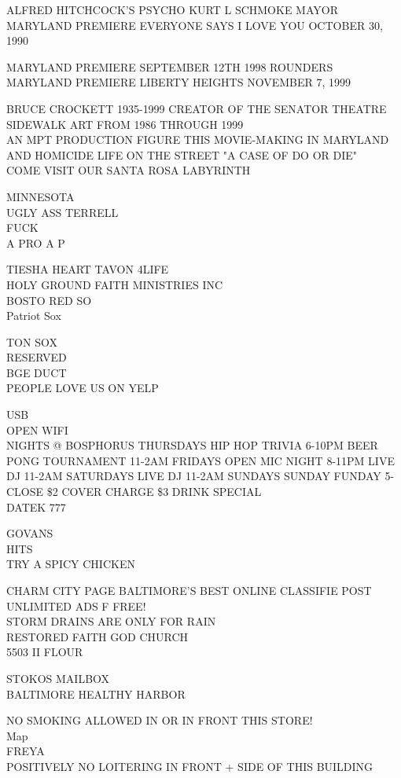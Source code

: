 \documentclass[10pt,letterpaper]{article}
\begin{document}
ALFRED HITCHCOCK'S PSYCHO KURT L SCHMOKE MAYOR\\
MARYLAND PREMIERE EVERYONE SAYS I LOVE YOU OCTOBER 30, 1990

MARYLAND PREMIERE SEPTEMBER 12TH 1998 ROUNDERS\\
MARYLAND PREMIERE LIBERTY HEIGHTS NOVEMBER 7, 1999

BRUCE CROCKETT 1935{-}1999 CREATOR OF THE SENATOR THEATRE SIDEWALK ART FROM 1986 THROUGH 1999\\
AN MPT PRODUCTION FIGURE THIS MOVIE{-}MAKING IN MARYLAND AND HOMICIDE LIFE ON THE STREET "A CASE OF DO OR DIE"\\
COME VISIT OUR SANTA ROSA LABYRINTH

MINNESOTA\\
UGLY ASS TERRELL\\
FUCK\\
A PRO A P

TIESHA HEART TAVON 4LIFE\\
HOLY GROUND FAITH MINISTRIES INC\\
BOSTO RED SO\\
Patriot Sox

TON SOX\\
RESERVED\\
BGE DUCT\\
PEOPLE LOVE US ON YELP

USB\\
OPEN WIFI\\
NIGHTS @ BOSPHORUS THURSDAYS HIP HOP TRIVIA 6{-}10PM BEER PONG TOURNAMENT 11{-}2AM FRIDAYS OPEN MIC NIGHT 8{-}11PM LIVE DJ 11{-}2AM SATURDAYS LIVE DJ 11{-}2AM SUNDAYS SUNDAY FUNDAY 5{-}CLOSE \$2 COVER CHARGE \$3 DRINK SPECIAL\\
DATEK 777

GOVANS\\
HITS\\
TRY A SPICY CHICKEN

CHARM CITY PAGE BALTIMORE'S BEST ONLINE CLASSIFIE POST UNLIMITED ADS F FREE!\\
STORM DRAINS ARE ONLY FOR RAIN\\
RESTORED FAITH GOD CHURCH\\
5503 II FLOUR

STOKOS MAILBOX\\
BALTIMORE HEALTHY HARBOR

NO SMOKING ALLOWED IN OR IN FRONT THIS STORE!\\
Map\\
FREYA\\
POSITIVELY NO LOITERING IN FRONT + SIDE OF THIS BUILDING
\end{document}
